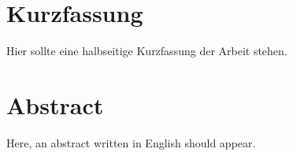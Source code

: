 \section*{Kurzfassung}
Hier sollte eine halbseitige Kurzfassung der Arbeit stehen.
\vfill\vfill\vfill\vfill\vfill\vfill
\section*{Abstract}
Here, an abstract written in English should appear.
\vfill\vfill\vfill\vfill\vfill\vfill